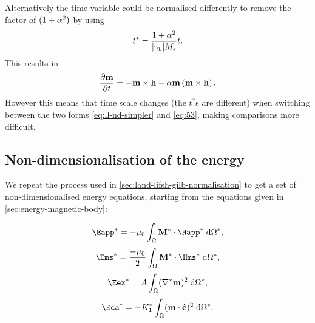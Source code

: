 Alternatively the time variable could be normalised differently to remove the factor of $(1 + \alpha^2)$ by using
\begin{equation}
  t^* = \frac{1 + \alpha^2}{{\left|{\gamma_{\text{\tiny{L}}}} \right|} M_s} t.
\end{equation}
This results in
\begin{equation}
  \frac{\partial \mathbf{m}}{\partial t} = -\mathbf{m} \times \mathbf{h} -\alpha \mathbf{m} \left(\mathbf{m} \times \mathbf{h} \right).
  \label{eq:ll-nd-simpler}
\end{equation}
However this means that time scale changes (\ie the $t^*$s are different) when switching between the two forms \cref{eq:ll-nd-simpler} and \cref{eq:53}, making comparisons more difficult.


\subsection{Non-dimensionalisation of the energy}
\label{sec:energy-calculations}

We repeat the process used in \cref{sec:land-lifsh-gilb-normalisation} to get a set of non-dimensionalised energy equations, starting from the equations given in \cref{sec:energy-magnetic-body}:

\begin{equation*}
  \Eapp^* = - \mu_0 \int_{\magd} \Mv^* \cdot \Happ^* \d \magd^*,
\end{equation*}
\begin{equation}
  \Ems^* =  \frac{-\mu_0}{2} \int_{\magd} \Mv^* \cdot \Hms^* \d \magd^*,
\end{equation}
\begin{equation*}
  \Eex^* =  \Exchc \int_{\magd} (\nabla^* \mv)^2 \d \magd^*,
\end{equation*}
\begin{equation*}
  \Eca^* =  -\Kone^* \int_\magd (\mv \cdot \ev)^2 \d \magd^*.
\end{equation*}


